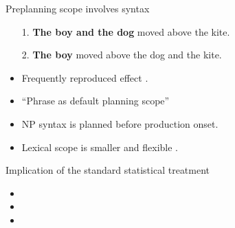 \begin{frame}{Preplanning scope involves syntax}

\begin{itemize}
	\item[1.] \textbf{The boy and the dog} moved above the kite.
	\item[2.] \textbf{The boy} moved above the dog and the kite.
\end{itemize}
\vfill
\begin{itemize}
		\item Frequently reproduced effect \parencite[e.g.][]{martin2014working,smi99,wag10}.
		\item ``Phrase as default planning scope'' \parencite{martin2010planning}
		\item NP syntax is planned before production onset.
		\item Lexical scope is smaller \parencite{gri01} and flexible \parencite{wheeldon2013}.
\end{itemize}

\end{frame}

\begin{frame}{Implication of the standard statistical treatment}

	\begin{itemize}
		\item {}
		\item {} 	
		\item {}
	\end{itemize}

\end{frame}

